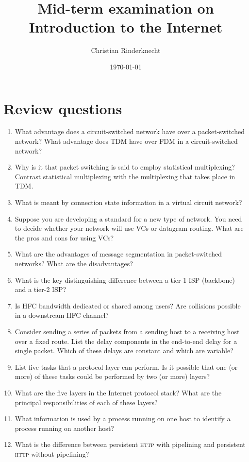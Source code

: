 \documentclass[12pt,a4paper]{article}
\title{Mid-term examination on Introduction to the Internet}
\author{Christian Rinderknecht}
\date{\today}
\begin{document}
\maketitle

\section{Review questions}

\begin{enumerate}

  \item What advantage does a circuit-switched network have over a
    packet-switched network? What advantage does TDM have over FDM in
    a circuit-switched network?

  \item Why is it that packet switching is said to employ statistical
    multiplexing? Contrast statistical multiplexing with the
    multiplexing that takes place in TDM.

  \item What is meant by connection state information in a virtual
    circuit network? 

  \item Suppose you are developing a standard for a new type of
    network. You need to decide whether your network will use VCs or
    datagram routing. What are the pros and cons for using VCs?

  \item What are the advantages of message segmentation in
    packet-switched networks? What are the disadvantages?

  \item What is the key distinguishing difference between a tier-1 ISP
    (backbone) and a tier-2 ISP?

  \item Is HFC bandwidth dedicated or shared among users? Are
    collisions possible in a downstream HFC channel?

  \item Consider sending a series of packets from a sending host to a
    receiving host over a fixed route. List the delay components in
    the end-to-end delay for a single packet. Which of these delays
    are constant and which are variable?

  \item List five tasks that a protocol layer can perform. Is it
    possible that one (or more) of these tasks could be performed by
    two (or more) layers?
 
  \item What are the five layers in the Internet protocol stack? What
    are the principal responsibilities of each of these layers?

  \item What information is used by a process running on one host to
    identify a process running on another host?

  \item What is the difference between persistent \textsc{http}
    with pipelining and persistent \textsc{http} without pipelining?

\end{enumerate}
\end{document}
